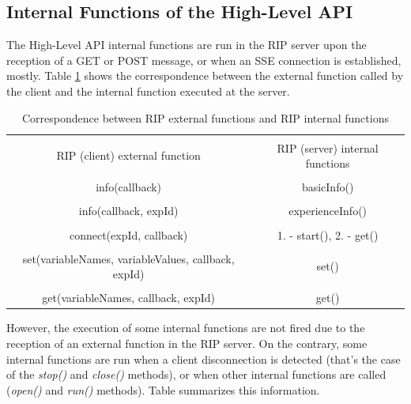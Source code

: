 \subsection{Internal Functions of the High-Level API}
The High-Level API internal functions are run in the RIP server upon the reception of a GET or POST message, or when an SSE connection is established, mostly. Table \ref{tab:internal-external-correspondence} shows the correspondence between the external function called by the client and the internal function executed at the server.

\begin{table}[b!]
    \centering
    \begin{tabular}{|c|c|}
        \hline
        & \\RIP (client) external function & RIP (server) internal functions \\
        \hline
        & \\info(callback) & basicInfo() \\
        \hline
        & \\info(callback, expId) & experienceInfo() \\
        \hline
        & \\connect(expId, callback) & 1. - start(), 2. - get() \\
        \hline
        & \\set(variableNames, variableValues, callback, expId) & set() \\
        \hline
        & \\get(variableNames, callback, expId) & get() \\
        \hline
    \end{tabular}
    \caption{Correspondence between RIP external functions and RIP internal functions}
    \label{tab:internal-external-correspondence}
\end{table}

However, the execution of some internal functions are not fired due to the reception of an external function in the RIP server. On the contrary, some internal functions are run when a client disconnection is detected (that's the case of the \textit{stop()} and \textit{close()} methods), or when other internal functions are called (\textit{open()} and \textit{run()} methods). Table summarizes this information.

